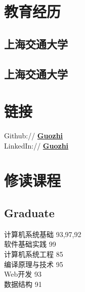 \documentclass[]{deedy-resume-openfont}
\begin{document}
%
%
\lastupdated

%
%

%
%

\begin{minipage}[t]{0.25\textwidth} 


\section{教育经历} 
\sectionsep

\subsection{上海交通大学}
\sectionsep

\subsection{上海交通大学}
\sectionsep


\section{链接}
\sectionsep  
Github:// \href{https://github.com/Guozhi-explore}{\bf Guozhi} \\
LinkedIn://  \href{https://www.linkedin.com/in/zhi-guo-316892186}{\bf Guozhi} \\


\section{修读课程}
\subsection{Graduate}
 计算机系统基础  93,97,92 \\
 软件基础实践 99\\
 计算机系统工程 85 \\
 编译原理与技术 95 \\
 Web开发 93 \\
 数据结构 91 \\
 \sectionsep


\end{minipage}
\end{document}
